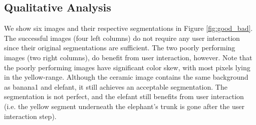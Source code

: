 \documentclass[10pt,twocolumn,letterpaper]{article}
\begin{document}
\subsection{Qualitative Analysis}
We show six images and their respective segmentations in Figure \ref{fig:good_bad}. The successful images (four left columns) do not require any user interaction since their original segmentations are sufficient. The two poorly performing images (two right columns), do benefit from user interaction, however. Note that the poorly performing images have significant color skew, with most pixels lying in the yellow-range. Although the ceramic image contains the same background as banana1 and elefant, it still achieves an acceptable segmentation. The segmentation is not perfect, and the elefant still benefits from user interaction (i.e. the yellow segment underneath the elephant's trunk is gone after the user interaction step).

{\small


}
\end{document}
